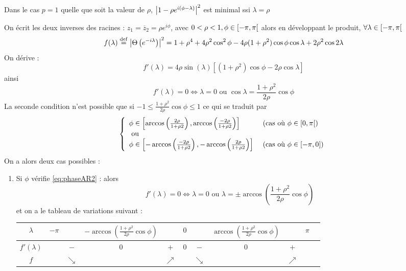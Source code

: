 \documentclass{report}
\begin{document}
\begin{Ex}[Cas où p=1 :]
Dans le cas $p=1$ quelle que soit la valeur de $\rho$, ${ \left| 1-\rho e^{i(\phi-\lambda)} \right|}^2$ est minimal ssi $\lambda = \rho$
\end{Ex}
\begin{Ex}[Cas où p=2 à racines complexes conjuguées]
On écrit les deux inverses des racines : $z_1=\overline{z}_2 = \rho e^{i\phi}$, avec $0<\rho<1, \phi \in {\left[ -\pi,\pi \right[}$ alors en développant le produit, $\forall \lambda \in {\left[ -\pi,\pi \right[}$
$$
f(\lambda) \stackrel{\rm def}{=} { \left| \Theta\left( e^{-i\lambda}\right) \right|}^2 = 1 + \rho^4 + 4\rho^2 \cos^2{\phi} - 4\rho(1+\rho^2)\cos{\phi} \cos{\lambda} + 2\rho^2\cos{2\lambda}
$$
On dérive :
$$
f'(\lambda) = 4\rho \sin(\lambda) \left[ (1+\rho^2) \cos{\phi} - 2\rho \cos{\lambda} \right]
$$
ainsi 
$$
f'(\lambda)=0 \iff \lambda = 0 \mbox{ ou } \cos{\lambda} = \frac{1+\rho^2}{2\rho} \cos{\phi}
$$
La seconde condition n'est possible que si $ -1\leq \frac{1+\rho^2}{2\rho} \cos{\phi} \leq 1$ ce qui se traduit par 
\begin{equation}\label{eq:phaseAR2}
{ \left\lbrace \begin{array}{ll} 
\phi \in {\left[ \arccos\left( \frac{2\rho}{1+\rho2} \right), \arccos\left( \frac{-2\rho}{1+\rho2} \right) \right]} & \mbox{ (cas où $\phi \in {\left[ 0,\pi \right[}$)} \\
\mbox{ ou } & \\
\phi \in {\left[ -\arccos\left( \frac{-2\rho}{1+\rho2} \right), -\arccos\left( \frac{2\rho}{1+\rho2} \right) \right]} & \mbox{ (cas où $\phi \in {\left[ -\pi,0 \right]}$)} \\
 \end{array} \right. }
\end{equation}
On a alors deux cas possibles :
\begin{enumerate}
\item Si $\phi$ vérifie \eqref{eq:phaseAR2} : alors 
$$
f'(\lambda)=0 \iff \lambda = 0 \mbox{ ou } \lambda = \pm \arccos\left(\frac{1+\rho^2}{2\rho} \cos{\phi}\right)
$$
et on a le tableau de variations suivant : \\
\begin{center}
\begin{tabular}{c|cccccccccc}
$\lambda$ & $-\pi$ & & $-\arccos\left(\frac{1+\rho^2}{2\rho} \cos{\phi}\right)$ & & $0$ & & $\arccos\left(\frac{1+\rho^2}{2\rho} \cos{\phi}\right)$ & & $\pi$  \\
\hline
$f'(\lambda)$ & & $-$ & $0$ & $+$ & $0$ & $-$ & $0$ & $+$ & \\
\hline
$f$ & & $\searrow$ & & $\nearrow$ & & $\searrow$ & & $\nearrow$ \\
\end{tabular}

\end{center}
\end{enumerate}
\end{Ex}
\end{document}
